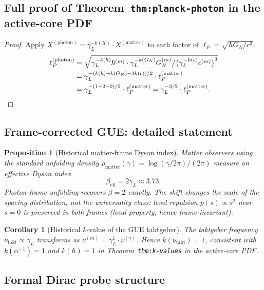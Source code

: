 \documentclass[12pt,a4paper]{article}
\newtheorem{proposition}[theorem]{Proposition}
\newtheorem{corollary}[theorem]{Corollary}
\newcommand{\gL}{\gamma_L}
\newcommand{\lP}{\ell_P}
\begin{document}
\subsection*{Full proof of Theorem~\texttt{thm:planck-photon} in the active-core PDF}
\label{app:planck}

\begin{proof}
Apply $X^{(\mathrm{photon})}=\gL^{-k(X)}\cdot X^{(\mathrm{matter})}$
to each factor of $\lP=\sqrt{\hbar G_N/c^3}$:
\begin{align*}
 \lP^{(\mathrm{photon})}
 &= \sqrt{
 \gL^{-k(\hbar)}\hbar^{(m)}
 \cdot\gL^{-k(G_N)}G_N^{(m)}
 \big/
 \bigl(\gL^{-k(c)}c^{(m)}\bigr)^3
 }\\
 &= \gL^{-(k(\hbar)+k(G_N)-3k(c))/2}
 \cdot\lP^{(\mathrm{matter})}\\
 &= \gL^{-(1+2-0)/2}\cdot\lP^{(\mathrm{matter})}
 = \gL^{-3/2}\cdot\lP^{(\mathrm{matter})}.\qedhere
\end{align*}
\end{proof}

\subsection{Frame-corrected GUE: detailed statement}
\label{app:gue-frame}

\begin{proposition}[Historical matter-frame Dyson index]
Matter observers using the standard unfolding density
$\rho_{\mathrm{matter}}(\gamma)=\log(\gamma/2\pi)/(2\pi)$
measure an effective Dyson index
\[
 \beta_{\mathrm{eff}} = 2\gL\approx 3.73.
\]
Photon-frame unfolding recovers $\beta=2$ exactly.
The shift changes the scale of the spacing distribution, not the
universality class: level repulsion $p(s)\propto s^2$ near $s=0$ is
preserved in both frames (local property, hence frame-invariant).
\end{proposition}

\begin{corollary}[Historical $k$-value of the GUE taktgeber]
The taktgeber frequency $\nu_{\mathrm{takt}}\propto\gL$
transforms as $\nu^{(m)}=\gL^1\cdot\nu^{(\gamma)}$.
Hence $k(\nu_{\mathrm{takt}})=1$, consistent with $k(\alpha^{-1})=1$
and $k(\hbar)=1$ in Theorem~\texttt{thm:k-values} in the active-core PDF.
\end{corollary}

\subsection{Formal Dirac probe structure}
\label{app:dirac-formal}
\end{document}
